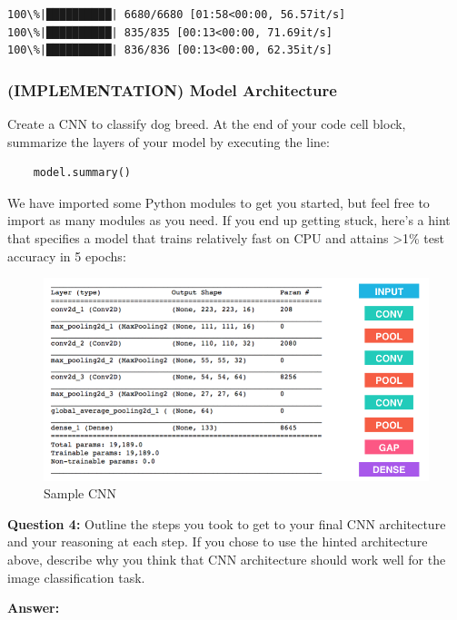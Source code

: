 \documentclass[11pt]{article}
\makeatletter
\def\maxwidth{\ifdim\Gin@nat@width>\linewidth\linewidth
    \else\Gin@nat@width\fi}
\let\Oldincludegraphics\includegraphics
\renewcommand{\includegraphics}[1]{\Oldincludegraphics[width=.8\maxwidth]{#1}}
\makeatother
\begin{document}
    \begin{Verbatim}[commandchars=\\\{\}]
100\%|██████████| 6680/6680 [01:58<00:00, 56.57it/s]
100\%|██████████| 835/835 [00:13<00:00, 71.69it/s]
100\%|██████████| 836/836 [00:13<00:00, 62.35it/s]

    \end{Verbatim}

    \subsubsection{(IMPLEMENTATION) Model
Architecture}\label{implementation-model-architecture}

Create a CNN to classify dog breed. At the end of your code cell block,
summarize the layers of your model by executing the line:

\begin{verbatim}
    model.summary()
\end{verbatim}

We have imported some Python modules to get you started, but feel free
to import as many modules as you need. If you end up getting stuck,
here's a hint that specifies a model that trains relatively fast on CPU
and attains \textgreater{}1\% test accuracy in 5 epochs:

\begin{figure}
\centering
\includegraphics{images/sample_cnn.png}
\caption{Sample CNN}
\end{figure}

\textbf{Question 4:} Outline the steps you took to get to your final CNN
architecture and your reasoning at each step. If you chose to use the
hinted architecture above, describe why you think that CNN architecture
should work well for the image classification task.

\textbf{Answer:}
\end{document}
